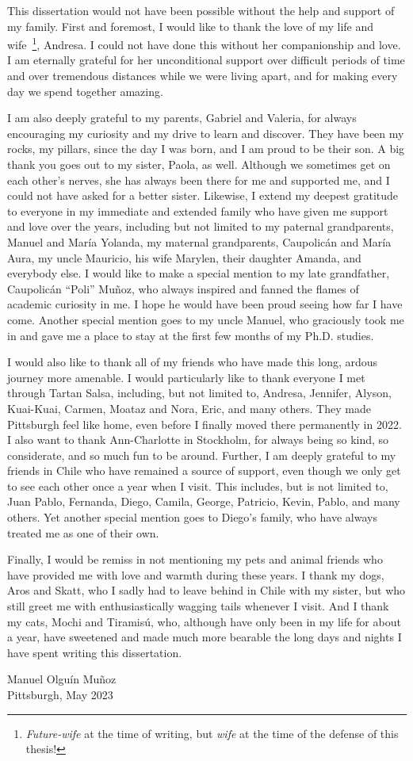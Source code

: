 This dissertation would not have been possible without the help and support of my family.
First and foremost, I would like to thank the love of my life and wife~\footnote{\emph{Future-wife} at the time of writing, but \emph{wife} at the time of the defense of this thesis!}, Andresa.
I could not have done this without her companionship and love.
I am eternally grateful for her unconditional support over difficult periods of time and over tremendous distances while we were living apart, and for making every day we spend together amazing.

I am also deeply grateful to my parents, Gabriel and Valeria, for always encouraging my curiosity and my drive to learn and discover.
They have been my rocks, my pillars, since the day I was born, and I am proud to be their son.
A big thank you goes out to my sister, Paola, as well.
Although we sometimes get on each other's nerves, she has always been there for me and supported me, and I could not have asked for a better sister.
Likewise, I extend my deepest gratitude to everyone in my immediate and extended family who have given me support and love over the years, including but not limited to my paternal grandparents, Manuel and María Yolanda, my maternal grandparents, Caupolicán and María Aura, my uncle Mauricio, his wife Marylen, their daughter Amanda, and everybody else.
I would like to make a special mention to my late grandfather, Caupolicán ``Poli'' Muñoz, who always inspired and fanned the flames of academic curiosity in me.
I hope he would have been proud seeing how far I have come.
Another special mention goes to my uncle Manuel, who graciously took me in and gave me a place to stay at the first few months of my Ph.D. studies.

I would also like to thank all of my friends who have made this long, ardous journey more amenable.
I would particularly like to thank everyone I met through Tartan Salsa, including, but not limited to, Andresa, Jennifer, Alyson, Kuai-Kuai, Carmen, Moataz and Nora, Eric, and many others.
They made Pittsburgh feel like home, even before I finally moved there permanently in 2022.
I also want to thank Ann-Charlotte in Stockholm, for always being so kind, so considerate, and so much fun to be around.
Further, I am deeply grateful to my friends in Chile who have remained a source of support, even though we only get to see each other once a year when I visit.
This includes, but is not limited to, Juan Pablo, Fernanda, Diego, Camila, George, Patricio, Kevin, Pablo, and many others.
Yet another special mention goes to Diego's family, who have always treated me as one of their own.

Finally, I would be remiss in not mentioning my pets and animal friends who have provided me with love and warmth during these years.
I thank my dogs, Aros and Skatt, who I sadly had to leave behind in Chile with my sister, but who still greet me with enthusiastically wagging tails whenever I visit.
And I thank my cats, Mochi and Tiramisú, who, although have only been in my life for about a year, have sweetened and made much more bearable the long days and nights I have spent writing this dissertation.

\bigskip

\noindent{}Manuel Olguín Muñoz\\
Pittsburgh, May 2023